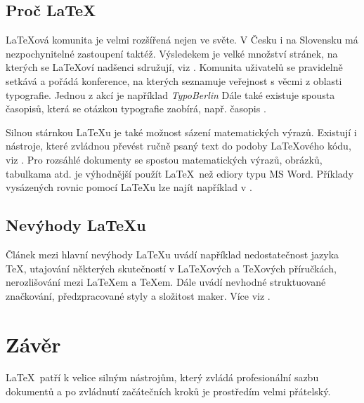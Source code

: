 \documentclass[a4paper, 11pt]{article}
\begin{document}
    \subsection{Proč \LaTeX}
    \LaTeX ová komunita je velmi rozšířená nejen ve světe. V Česku i na Slovensku má nezpochynitelné zastoupení taktéž. Výsledekem je velké množství stránek, na kterých se \LaTeX oví nadšenci sdružují, viz \cite{cstug}. Komunita uživatelů se pravidelně setkává a pořádá konference, na kterých seznamuje veřejnost s věcmi z oblasti typografie. Jednou z akcí je například \textit{TypoBerlin} Dále také existuje spousta časopisů, která se otázkou typografie zaobírá, např. časopis \cite{Typo}.

    Silnou stárnkou \LaTeX u je také možnost sázení matematických výrazů. Existují i nástroje, které zvládnou převést ručně psaný text do podoby \LaTeX ového kódu, viz \cite{Oksuz}. Pro rozsáhlé dokumenty se spostou matematických výrazů, obrázků, tabulkama atd. je výhodnější použít \LaTeX\ než ediory typu MS Word. \cite{Martinek} Příklady vysázených rovnic pomocí \LaTeX u lze najít například v \cite{Castro}.

    \subsection{Nevýhody \LaTeX u}
    Článek \cite{Olsak} mezi hlavní nevýhody \LaTeX u uvádí například nedostatečnost jazyka \TeX, utajování některých skutečností v \LaTeX ových a \TeX ových příručkách, nerozlišování mezi \LaTeX em a \TeX em. Dále uvádí nevhodné struktuované značkování, předzpracované styly a složitost maker. Více viz \cite{Olsak}.

    \section{Závěr}
    \LaTeX\ patří k velice silným nástrojům, který zvládá profesionální sazbu dokumentů a po zvládnutí začátečních kroků je prostředím velmi přátelský. \cite{Bojko}



    \newpage
	
	\renewcommand{\refname}{Literatura}
	
\end{document}
